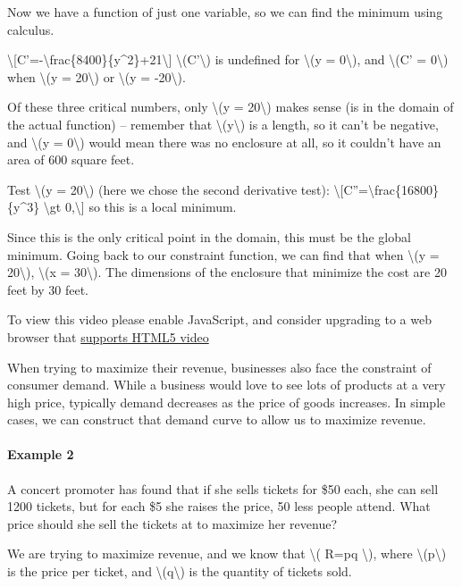 Now we have a function of just one variable, so we can find the minimum
using calculus.

\textbackslash{}{[}C'=-\textbackslash{}frac\{8400\}\{y\^{}2\}+21\textbackslash{}{]}
\textbackslash{}(C'\textbackslash{}) is undefined for \textbackslash{}(y
= 0\textbackslash{}), and \textbackslash{}(C' = 0\textbackslash{}) when
\textbackslash{}(y = 20\textbackslash{}) or \textbackslash{}(y =
-20\textbackslash{}).

Of these three critical numbers, only \textbackslash{}(y =
20\textbackslash{}) makes sense (is in the domain of the actual
function) -- remember that \textbackslash{}(y\textbackslash{}) is a
length, so it can't be negative, and \textbackslash{}(y =
0\textbackslash{}) would mean there was no enclosure at all, so it
couldn't have an area of 600 square feet.

Test \textbackslash{}(y = 20\textbackslash{}) (here we chose the second
derivative test):
\textbackslash{}{[}C''=\textbackslash{}frac\{16800\}\{y\^{}3\}
\textbackslash{}gt 0,\textbackslash{}{]} so this is a local minimum.

Since this is the only critical point in the domain, this must be the
global minimum. Going back to our constraint function, we can find that
when \textbackslash{}(y = 20\textbackslash{}), \textbackslash{}(x =
30\textbackslash{}). The dimensions of the enclosure that minimize the
cost are 20 feet by 30 feet.

To view this video please enable JavaScript, and consider upgrading to a
web browser that \href{http://videojs.com/html5-video-support/}{supports
HTML5 video}

When trying to maximize their revenue, businesses also face the
constraint of consumer demand. While a business would love to see lots
of products at a very high price, typically demand decreases as the
price of goods increases. In simple cases, we can construct that demand
curve to allow us to maximize revenue.

\hypertarget{example-2}{%
\paragraph{Example 2}\label{example-2}}

A concert promoter has found that if she sells tickets for \$50 each,
she can sell 1200 tickets, but for each \$5 she raises the price, 50
less people attend. What price should she sell the tickets at to
maximize her revenue?

We are trying to maximize revenue, and we know that \textbackslash{}(
R=pq \textbackslash{}), where \textbackslash{}(p\textbackslash{}) is the
price per ticket, and \textbackslash{}(q\textbackslash{}) is the
quantity of tickets sold.

